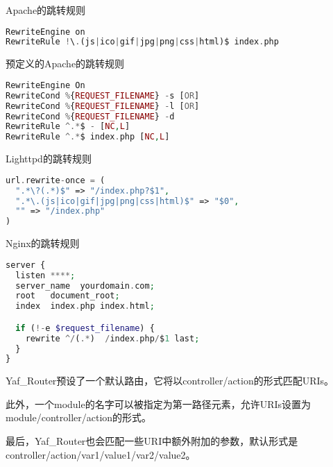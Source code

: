 \begin{example}
Apache的跳转规则
\begin{lstlisting}[language=PHP]
RewriteEngine on
RewriteRule !\.(js|ico|gif|jpg|png|css|html)$ index.php
\end{lstlisting}
\end{example}



\begin{example}
预定义的Apache的跳转规则
\begin{lstlisting}[language=PHP]
RewriteEngine On
RewriteCond %{REQUEST_FILENAME} -s [OR]
RewriteCond %{REQUEST_FILENAME} -l [OR]
RewriteCond %{REQUEST_FILENAME} -d
RewriteRule ^.*$ - [NC,L]
RewriteRule ^.*$ index.php [NC,L]
\end{lstlisting}
\end{example}

\begin{example}
Lighttpd的跳转规则
\begin{lstlisting}[language=PHP]
url.rewrite-once = (
  ".*\?(.*)$" => "/index.php?$1",
  ".*\.(js|ico|gif|jpg|png|css|html)$" => "$0",
  "" => "/index.php"
)
\end{lstlisting}
\end{example}


\begin{example}
Nginx的跳转规则
\begin{lstlisting}[language=PHP]
server {
  listen ****;
  server_name  yourdomain.com;
  root   document_root;
  index  index.php index.html;

  if (!-e $request_filename) {
    rewrite ^/(.*)  /index.php/$1 last;
  }
}
\end{lstlisting}
\end{example}


Yaf\_Router预设了一个默认路由，它将以controller/action的形式匹配URIs。

此外，一个module的名字可以被指定为第一路径元素，允许URIs设置为module/controller/action的形式。

最后，Yaf\_Router也会匹配一些URI中额外附加的参数，默认形式是controller/action/var1/value1/var2/value2。


